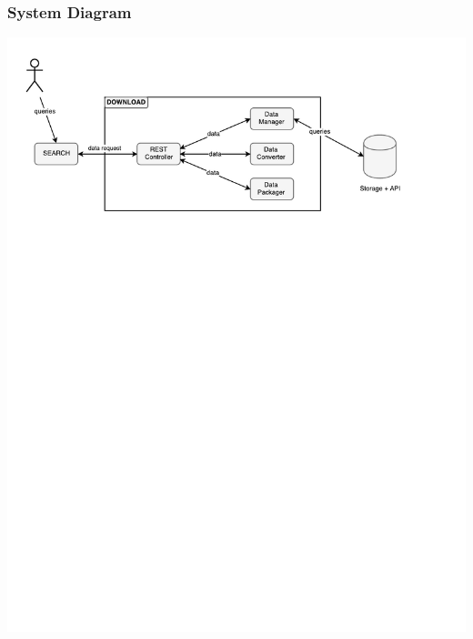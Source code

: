 \documentclass[xcolor=table]{beamer}
\begin{document}
\begin{frame}
	\frametitle{System Diagram}
		\includegraphics[width=\linewidth]{component.pdf}
\end{frame}
\end{document}
